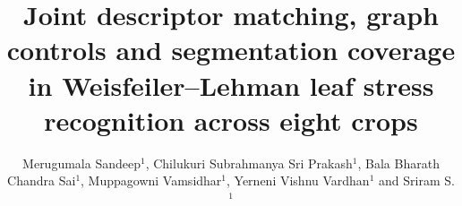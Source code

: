 \documentclass[utf8]{FrontiersinHarvard}
\def\firstAuthorLast{Merugumala et~al.}
\def\Authors{Merugumala Sandeep$^1$, Chilukuri Subrahmanya Sri Prakash$^1$, Bala Bharath Chandra Sai$^1$, Muppagowni Vamsidhar$^1$, Yerneni Vishnu Vardhan$^1$ and Sriram S.$^1$}
\newcommand{\allpanels}{}
\begin{document}
\onecolumn{}\linenumbers
\title[Graph kernels for leaf stress screening]{Joint descriptor matching, graph controls and segmentation coverage in Weisfeiler--Lehman leaf stress recognition across eight crops}
\author[\firstAuthorLast]{\Authors}\address{}\correspondance{}\extraAuth{}\maketitle



\ifdefined\submissionlayout\clearpage\allpanels\fi
\end{document}
